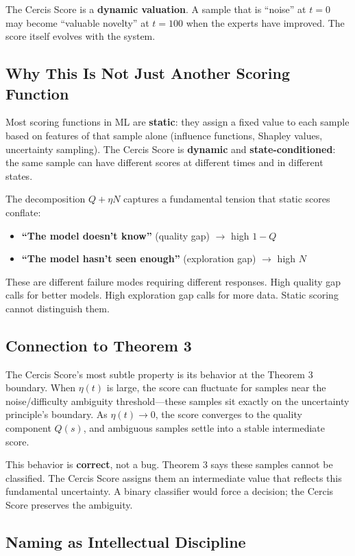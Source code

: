 \documentclass[12pt,a4paper]{ctexart}
\begin{document}
The Cercis Score is a \textbf{dynamic valuation}. A sample that is ``noise'' at $t = 0$ may become ``valuable novelty'' at $t = 100$ when the experts have improved. The score itself evolves with the system.

\subsection{Why This Is Not Just Another Scoring Function}

Most scoring functions in ML are \textbf{static}: they assign a fixed value to each sample based on features of that sample alone (influence functions, Shapley values, uncertainty sampling). The Cercis Score is \textbf{dynamic} and \textbf{state-conditioned}: the same sample can have different scores at different times and in different states.

The decomposition $Q + \eta N$ captures a fundamental tension that static scores conflate:
\begin{itemize}
\item \textbf{``The model doesn't know''} (quality gap) $\to$ high $1-Q$
\item \textbf{``The model hasn't seen enough''} (exploration gap) $\to$ high $N$
\end{itemize}

These are different failure modes requiring different responses. High quality gap calls for better models. High exploration gap calls for more data. Static scoring cannot distinguish them.

\subsection{Connection to Theorem 3}

The Cercis Score's most subtle property is its behavior at the Theorem 3 boundary. When $\eta(t)$ is large, the score can fluctuate for samples near the noise/difficulty ambiguity threshold—these samples sit exactly on the uncertainty principle's boundary. As $\eta(t) \to 0$, the score converges to the quality component $Q(s)$, and ambiguous samples settle into a stable intermediate score.

This behavior is \textbf{correct}, not a bug. Theorem 3 says these samples cannot be classified. The Cercis Score assigns them an intermediate value that reflects this fundamental uncertainty. A binary classifier would force a decision; the Cercis Score preserves the ambiguity.

\subsection{Naming as Intellectual Discipline}
\end{document}
